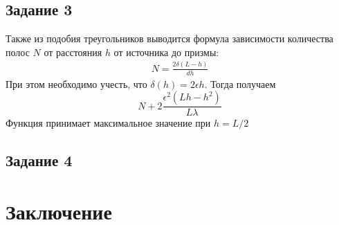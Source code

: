 \subsection{Задание 3}
Также из подобия треугольников выводится формула зависимости количества полос $N$ от расстояния $h$ от источника до призмы:
\begin{gather}
	N=\frac{2\delta(L-h)}{dh} \nonumber
\end{gather}
При этом необходимо учесть, что $\delta(h)=2\epsilon h$. Тогда получаем 
\begin{equation}
	N+2\frac{\epsilon^2(Lh-h^2)}{L\lambda}
\end{equation}
Функция принимает максимальное значение при $h=L/2$


\subsection{Задание 4}


\section{Заключение}

 